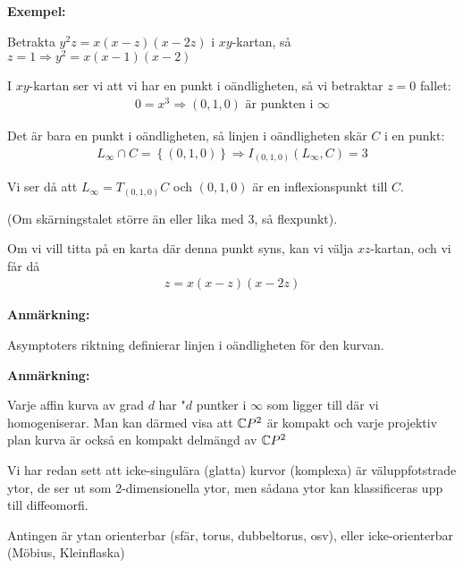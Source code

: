 \par\bigskip
\noindent\textbf{Exempel:}\par
\noindent Betrakta $y^2z = x(x-z)(x-2z)$ i $xy$-kartan, så $z=1\Rightarrow y^2 = x(x-1)(x-2)$\par
\noindent I $xy$-kartan ser vi att vi har en punkt i oändligheten, så vi betraktar $z=0$ fallet:
\begin{equation*}
  \begin{gathered}
    0 = x^3\Rightarrow (0,1,0)\text{ är punkten i }\infty
  \end{gathered}
\end{equation*}\par
\noindent Det är bara en punkt i oändligheten, så linjen i oändligheten skär $C$ i en punkt:
\begin{equation*}
  \begin{gathered}
    L_\infty\cap C = \left\{(0,1,0)\right\}\Rightarrow I_{(0,1,0)}(L_\infty, C) = 3
  \end{gathered}
\end{equation*}\par
\noindent Vi ser då att $L_\infty = T_{(0,1,0)}C$ och $(0,1,0)$ är en inflexionspunkt till $C$.\par
\noindent (Om skärningstalet större än eller lika med 3, så flexpunkt).\par
\noindent Om vi vill titta på en karta där denna punkt syns, kan vi välja $xz$-kartan, och vi får då
\begin{equation*}
  \begin{gathered}
    z = x(x-z)(x-2z)
  \end{gathered}
\end{equation*}
\par\bigskip
\noindent\textbf{Anmärkning:}\par
\noindent Asymptoters riktning definierar linjen i oändligheten för den kurvan.
\par\bigskip
\noindent\textbf{Anmärkning:}\par
\noindent Varje affin kurva av grad $d$ har "$d$ puntker i $\infty$ som ligger till där vi homogeniserar. Man kan därmed visa att $\mathbb{C} P^2$ är kompakt och varje projektiv plan kurva är också en kompakt delmängd av $\mathbb{C} P^2$ \par
\noindent Vi har redan sett att icke-singulära (glatta) kurvor (komplexa) är väluppfotstrade ytor, de ser ut som 2-dimensionella ytor, men sådana ytor kan klassificeras upp till diffeomorfi.\par
\noindent Antingen är ytan orienterbar (sfär, torus, dubbeltorus, osv), eller icke-orienterbar (Möbius, Kleinflaska)
